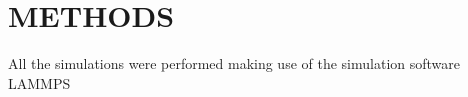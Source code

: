 \newpage
\section{METHODS}
All the simulations  were performed making use of the simulation software LAMMPS
\cite{LAMMPSDocumentation,steveplimptonLAMMPS}



